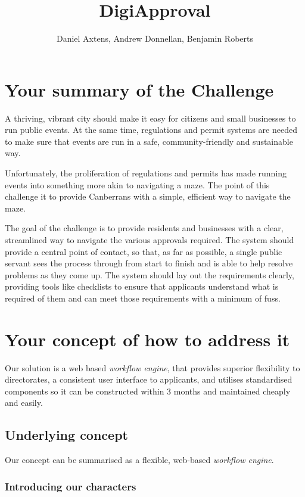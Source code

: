 \documentclass[12pt]{article}
\title{DigiApproval}
\author{Daniel Axtens, Andrew Donnellan, Benjamin Roberts}
\begin{document}
\maketitle

\section{Your summary of the Challenge}

A thriving, vibrant city should make it easy for citizens and small
businesses to run public events. At the same time, regulations and
permit systems are needed to make sure that events are run in a safe,
community-friendly and sustainable way.

Unfortunately, the proliferation of regulations and permits has made
running events into something more akin to navigating a maze. The point
of this challenge it to provide Canberrans with a simple, efficient way
to navigate the maze.

The goal of the challenge is to provide residents and businesses with a
clear, streamlined way to navigate the various approvals required. The
system should provide a central point of contact, so that, as far as
possible, a single public servant sees the process through from start to
finish and is able to help resolve problems as they come up. The system
should lay out the requirements clearly, providing tools like checklists
to ensure that applicants understand what is required of them and can
meet those requirements with a minimum of fuss.

\section{Your concept of how to address it}

Our solution is a web based \emph{workflow engine}, that provides
superior flexibility to directorates, a consistent user interface to
applicants, and utilises standardised components so it can be
constructed within 3 months and maintained cheaply and easily.
\newpage
\subsection{Underlying concept}

Our concept can be summarised as a flexible, web-based \emph{workflow
engine}.

\subsubsection{Introducing our characters}
\end{document}
